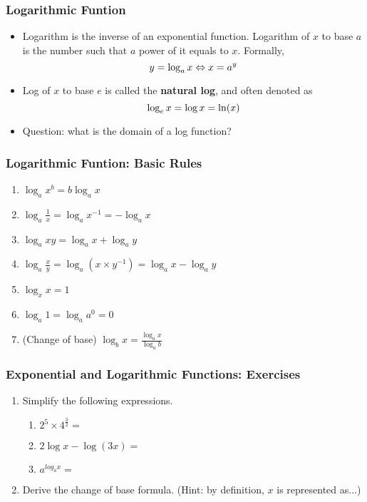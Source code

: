 \documentclass[pdflatex, 12pt]{beamer}
\begin{document}
\begin{frame}
\frametitle{Logarithmic Funtion}
\begin{itemize}
\item Logarithm is the inverse of an exponential function. Logarithm of $x$ to base $a$ is the number such that $a$ power of it equals to $x$. Formally, 
\begin{equation}
y = \log_{a} x \Leftrightarrow x = a^{y} \notag
\end{equation}
\item Log of $x$ to base $e$ is called the \textbf{natural log}, and often denoted as 
\begin{equation}
\log_{e} x = \log x = \mathrm{ln}(x) \notag
\end{equation}
\item Question: what is the domain of a log function?
\end{itemize}
\end{frame}

\begin{frame}
\frametitle{Logarithmic Funtion: Basic Rules}
\begin{enumerate}
\item $\log_{a} x^{b} = b\log_{a} x$
\item $\log_{a} \frac{1}{x} = \log_{a} x^{-1} = -\log_{a} x$
\item $\log_{a} xy = \log_{a} x + \log_{a} y$
\item $\log_{a} \frac{x}{y} = \log_{a} (x \times y^{-1}) = \log_{a} x - \log_{a} y$
\item $\log_{x} x = 1$
\item $\log_{a} 1 = \log_{a} a^{0} = 0$
\item (Change of base) $\log_{b} x = \frac{\log_{a} x}{\log_{a} b}$
\end{enumerate}
\end{frame}

\begin{frame}
\frametitle{Exponential and Logarithmic Functions: Exercises}
\begin{enumerate}
\item Simplify the following expressions.
 \begin{enumerate}
 \item $2^{5} \times 4^{\frac{3}{2}} = $
 \item $2\log x - \log(3x) = $
 \item $a^{log_{a} x} = $
 \end{enumerate}
\vspace{0.4cm}
\item Derive the change of base formula. (Hint: by definition, $x$ is represented as...)
\end{enumerate}
\end{frame}
\end{document}
